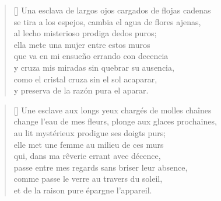 



\settowidth{\versewidth}{Se tira a los espejos, cambia el agua de flores ajenas,}

\bigskip

\begin{verse}[\versewidth]
Una esclava de largos ojos cargados de flojas cadenas \\
se tira a los espejos, cambia el agua de flores ajenas, \\
al lecho misterioso prodiga dedos puros; \\
ella mete una mujer entre estos muros \\
que va en mi ensueño errando con decencia \\
y cruza mis miradas sin quebrar su ausencia, \\
como el cristal cruza sin el sol acaparar, \\
y preserva de la razón pura el aparar.
\end{verse}

\newpage



\settowidth{\versewidth}{Change l'eau de mes fleurs, plonge aux glaces prochaines,}

\bigskip

{\itshape
\begin{verse}[\versewidth]
Une esclave aux longs yeux chargés de molles chaînes \\
change l'eau de mes fleurs, plonge aux glaces prochaines, \\
au lit mystérieux prodigue ses doigts purs; \\
elle met une femme au milieu de ces murs \\
qui, dans ma rêverie errant avec décence, \\
passe entre mes regards sans briser leur absence, \\
comme passe le verre au travers du soleil, \\
et de la raison pure épargne l'appareil.
\end{verse}
}
